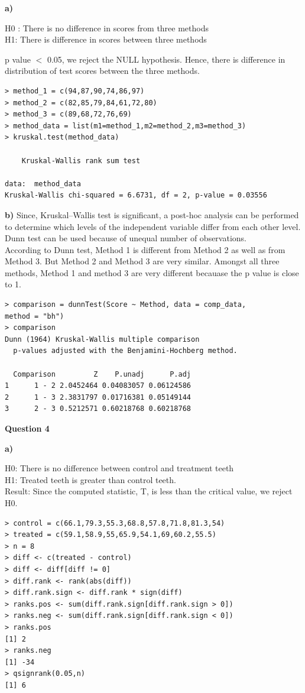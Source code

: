 \documentclass[12pt,letterpaper]{article}
\begin{document}
\textbf{{a)}}

H0 : There is no difference in scores from three methods\\
H1: There is difference in scores between three methods

p value $<$ 0.05, we reject the NULL hypothesis. Hence, there is difference in distribution of test scores between the three methods. 

\begin{lstlisting}[label=R Code,caption=Q3(a) R Code Output]
> method_1 = c(94,87,90,74,86,97)
> method_2 = c(82,85,79,84,61,72,80)
> method_3 = c(89,68,72,76,69)
> method_data = list(m1=method_1,m2=method_2,m3=method_3)
> kruskal.test(method_data)

	Kruskal-Wallis rank sum test

data:  method_data
Kruskal-Wallis chi-squared = 6.6731, df = 2, p-value = 0.03556
\end{lstlisting}
\textbf{{b)}}
Since, Kruskal–Wallis test is significant, a post-hoc analysis can be performed to determine which levels of the independent variable differ from each other level. Dunn test can be used because of unequal number of observations. \\
According to Dunn test, Method 1 is different from Method 2 as well as from Method 3. But Method 2 and Method 3 are very similar.
Amongst all three methods, Method 1 and method 3 are very different becauase the p value is close to 1. 

\begin{lstlisting}[label=R Code,caption=Q3(b) R Code Output]
> comparison = dunnTest(Score ~ Method, data = comp_data,
method = "bh")
> comparison
Dunn (1964) Kruskal-Wallis multiple comparison
  p-values adjusted with the Benjamini-Hochberg method.

  Comparison         Z    P.unadj      P.adj
1      1 - 2 2.0452464 0.04083057 0.06124586
2      1 - 3 2.3831797 0.01716381 0.05149144
3      2 - 3 0.5212571 0.60218768 0.60218768
\end{lstlisting}
{\Large \textbf{Question 4}}

\textbf{{a)}}

H0: There is no difference between control and treatment teeth\\
H1: Treated teeth is greater than control teeth.\\

Result: Since the computed statistic, T, is less than the critical value, we reject H0. 

\begin{lstlisting}[label=R Code,caption=Q4 (a) R Code Output]
> control = c(66.1,79.3,55.3,68.8,57.8,71.8,81.3,54)
> treated = c(59.1,58.9,55,65.9,54.1,69,60.2,55.5)
> n = 8
> diff <- c(treated - control)
> diff <- diff[diff != 0]
> diff.rank <- rank(abs(diff))
> diff.rank.sign <- diff.rank * sign(diff)
> ranks.pos <- sum(diff.rank.sign[diff.rank.sign > 0])
> ranks.neg <- sum(diff.rank.sign[diff.rank.sign < 0])
> ranks.pos
[1] 2
> ranks.neg
[1] -34
> qsignrank(0.05,n)
[1] 6
\end{lstlisting}
\end{document}
